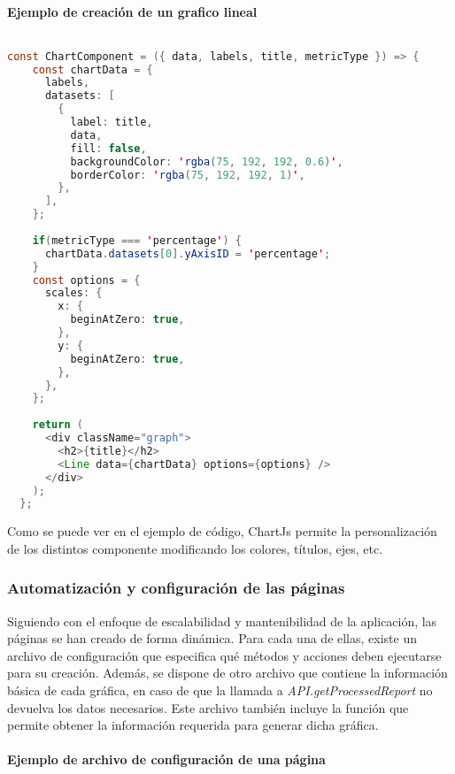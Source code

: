 \paragraph{Ejemplo de creación de un grafico lineal}
\begin{lstlisting}[language=Java]
    
const ChartComponent = ({ data, labels, title, metricType }) => {
    const chartData = {
      labels,
      datasets: [
        {
          label: title,
          data,
          fill: false,
          backgroundColor: 'rgba(75, 192, 192, 0.6)',
          borderColor: 'rgba(75, 192, 192, 1)',
        },
      ],
    };
  
    if(metricType === 'percentage') {
      chartData.datasets[0].yAxisID = 'percentage';
    }
    const options = {
      scales: {
        x: {
          beginAtZero: true,
        },
        y: {
          beginAtZero: true,
        },
      },
    };
  
    return (
      <div className="graph">
        <h2>{title}</h2>
        <Line data={chartData} options={options} />
      </div>
    );
  };
\end{lstlisting}

Como se puede ver en el ejemplo de código, ChartJs permite la personalización de los distintos componente modificando los colores, 
títulos, ejes, etc. 

\subsubsection{Automatización y configuración de las páginas}
\label{sec:automatizacion-configuracion-paginas}

Siguiendo con el enfoque de escalabilidad y mantenibilidad de la aplicación, las páginas se han creado de forma dinámica. 
Para cada una de ellas, existe un archivo de configuración que especifica qué métodos y acciones deben ejecutarse para su 
creación. Además, se dispone de otro archivo que contiene la información básica de cada gráfica, en caso de que la llamada 
a \textit{API.getProcessedReport} no devuelva los datos necesarios. Este archivo también incluye la función que permite 
obtener la información requerida para generar dicha gráfica.

\paragraph{Ejemplo de archivo de configuración de una página}

